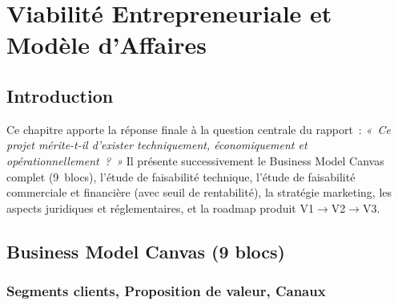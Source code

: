 \documentclass[12pt, a4paper]{report}
\begin{document}
\chapter{Viabilité Entrepreneuriale et Modèle d'Affaires}

\section{Introduction}

Ce chapitre apporte la réponse finale à la question centrale du rapport~:
\textit{«~Ce projet mérite-t-il d'exister techniquement, économiquement et
opérationnellement~?~»} Il présente successivement le Business Model Canvas
complet (9~blocs), l'étude de faisabilité technique, l'étude de faisabilité
commerciale et financière (avec seuil de rentabilité), la stratégie marketing,
les aspects juridiques et réglementaires, et la roadmap produit V1$\to$V2$\to$V3.

\section{Business Model Canvas (9 blocs)}

\subsection{Segments clients, Proposition de valeur, Canaux}
\end{document}
